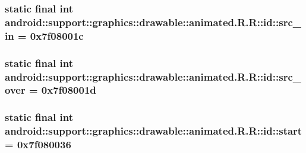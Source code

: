 \hypertarget{classandroid_1_1support_1_1graphics_1_1drawable_1_1animated_1_1_r_1_1id_f28df49da14f9a3d1901ff075823e8d6}{
\subsubsection[{src\_\-in}]{\setlength{\rightskip}{0pt plus 5cm}static final int android::support::graphics::drawable::animated.R.R::id::src\_\-in = 0x7f08001c}}
\label{classandroid_1_1support_1_1graphics_1_1drawable_1_1animated_1_1_r_1_1id_f28df49da14f9a3d1901ff075823e8d6}


\hypertarget{classandroid_1_1support_1_1graphics_1_1drawable_1_1animated_1_1_r_1_1id_69325ba27456617ac9d8d8de03a3633a}{
\subsubsection[{src\_\-over}]{\setlength{\rightskip}{0pt plus 5cm}static final int android::support::graphics::drawable::animated.R.R::id::src\_\-over = 0x7f08001d}}
\label{classandroid_1_1support_1_1graphics_1_1drawable_1_1animated_1_1_r_1_1id_69325ba27456617ac9d8d8de03a3633a}


\hypertarget{classandroid_1_1support_1_1graphics_1_1drawable_1_1animated_1_1_r_1_1id_76cb2a312cf535b997865035074ffae3}{
\subsubsection[{start}]{\setlength{\rightskip}{0pt plus 5cm}static final int android::support::graphics::drawable::animated.R.R::id::start = 0x7f080036}}
\label{classandroid_1_1support_1_1graphics_1_1drawable_1_1animated_1_1_r_1_1id_76cb2a312cf535b997865035074ffae3}


